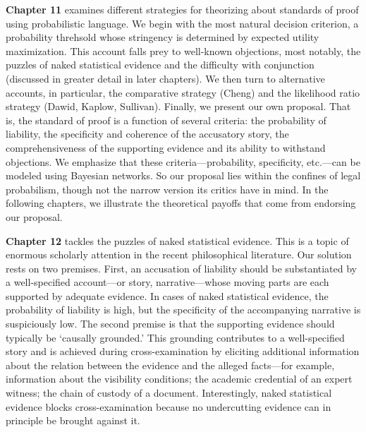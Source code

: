 \documentclass[
  10pt,
  dvipsnames,enabledeprecatedfontcommands]{scrartcl}
\begin{document}
\textbf{Chapter 11} examines different strategies for theorizing about
standards of proof using probabilistic language. We begin with the most
natural decision criterion, a probability threhsold whose stringency is
determined by expected utility maximization. This account falls prey to
well-known objections, most notably, the puzzles of naked statistical
evidence and the difficulty with conjunction (discussed in greater
detail in later chapters). We then turn to alternative accounts, in
particular, the comparative strategy (Cheng) and the likelihood ratio
strategy (Dawid, Kaplow, Sullivan). Finally, we present our own
proposal. That is, the standard of proof is a function of several
criteria: the probability of liability, the specificity and coherence of
the accusatory story, the comprehensiveness of the supporting evidence
and its ability to withstand objections. We emphasize that these
criteria---probability, specificity, etc.---can be modeled using
Bayesian networks. So our proposal lies within the confines of legal
probabilism, though not the narrow version its critics have in mind. In
the following chapters, we illustrate the theoretical payoffs that come
from endorsing our proposal.

\textbf{Chapter 12} tackles the puzzles of naked statistical evidence.
This is a topic of enormous scholarly attention in the recent
philosophical literature. Our solution rests on two premises. First, an
accusation of liability should be substantiated by a well-specified
account---or story, narrative---whose moving parts are each supported by
adequate evidence. In cases of naked statistical evidence, the
probability of liability is high, but the specificity of the
accompanying narrative is suspiciously low. The second premise is that
the supporting evidence should typically be `causally grounded.' This
grounding contributes to a well-specified story and is achieved during
cross-examination by eliciting additional information about the relation
between the evidence and the alleged facts---for example, information
about the visibility conditions; the academic credential of an expert
witness; the chain of custody of a document. Interestingly, naked
statistical evidence blocks cross-examination because no undercutting
evidence can in principle be brought against it.
\end{document}
